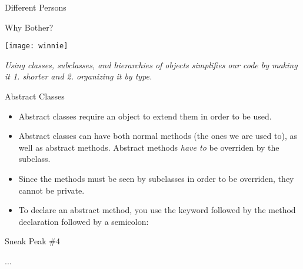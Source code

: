 \begin{frame}[fragile]{Different Persons}
\begin{semiverbatim}\end{semiverbatim}
\end{frame}

\begin{frame}{Why Bother?}
\begin{center}
\texttt{[image: winnie]}

\emph{Using classes, subclasses, and hierarchies of objects simplifies our code by making it 1. shorter and 2. organizing it by type.}\end{center}
\end{frame}

\begin{frame}{Abstract Classes}
\begin{itemize}
\item Abstract classes require an object to extend them in order to be used. \pause
\item Abstract classes can have both normal methods (the ones we are used to), as well as abstract methods. Abstract methods \emph{have to} be overriden by the subclass.
\item Since the methods must be seen by subclasses in order to be overriden, they cannot be private. \pause
\item To declare an abstract method, you use the  keyword followed by the method declaration followed by a semicolon:

\begin{center}
\end{center}

\end{itemize}
\end{frame}

\begin{frame}[fragile]{Sneak Peak \#4}
\begin{semiverbatim}\end{semiverbatim}

...
\end{frame}


